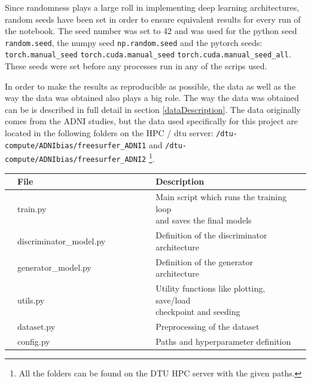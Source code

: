 \documentclass[12pt, fleqn, titlepage]{article}
\begin{document}
\noindent Since randomness plays a large roll in implementing deep learning architectures, random seeds have been set in order to ensure equivalent results for every run of the notebook. The seed number was set to 42 and was used for the python seed \texttt{random.seed}, the numpy seed \texttt{np.random.seed} and the pytorch seeds: \newline \texttt{torch.manual\_seed} \texttt{torch.cuda.manual\_seed}
\texttt{torch.cuda.manual\_seed\_all}. These seeds were set before any processes run in any of the scrips used.

In order to make the results as reproducible as possible, the data as well as the way the data was obtained also plays a big role. The way the data was obtained can be is described in full detail in section \ref{dataDescription}. The data originally comes from the ADNI studies, but the data used specifically for this project are located in the following folders on the HPC / dtu server: \texttt{/dtu-compute/ADNIbias/freesurfer\_ADNI1} and \texttt{/dtu-compute/ADNIbias/freesurfer\_ADNI2} \footnote{All the folders can be found on the DTU HPC server with the given paths.}. \\

\begin{table}[H]\label{fig:files}
	\begin{center}
		\begin{tabular}{l l l l l l l l l}
			\toprule
			& \textbf{File}          & & & & & & \textbf{Description}  & \\ \midrule
			& train.py               & & & & & & \makecell[tl]{Main script which runs the training loop \\ and saves the final models} & \\
			& discriminator\_model.py& & & & & & Definition of the discriminator architecture & \\
			& generator\_model.py    & & & & & & Definition of the generator architecture & \\
			& utils.py               & & & & & & \makecell[tl]{Utility functions like plotting, save/load \\ checkpoint and seeding} & \\
			& dataset.py             & & & & & & Preprocessing of the dataset & \\
			& config.py              & & & & & & Paths and hyperparameter definition & \\ \bottomrule
		\end{tabular}
	\end{center}
\end{table}
\end{document}
